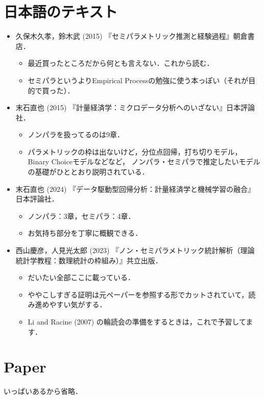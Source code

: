 \documentclass{jsarticle}
\begin{document}
\section{日本語のテキスト}

\begin{itemize}
  \item 久保木久孝，鈴木武 (2015) 『セミパラメトリック推測と経験過程』朝倉書店．
        \begin{itemize}
          \item 最近買ったところだから何とも言えない．これから読む．
          \item セミパラというよりEmpirical Processの勉強に使う本っぽい（それが目的で買った）．
        \end{itemize}  

  \item 末石直也 (2015) 『計量経済学：ミクロデータ分析へのいざない』日本評論社．
        \begin{itemize}
          \item ノンパラを扱ってるのは9章．
          \item パラメトリックの枠は出ないけど，分位点回帰，打ち切りモデル，Binary Choiceモデルなどなど，
                ノンパラ・セミパラで推定したいモデルの基礎がひととおり説明されている．
        \end{itemize}
  
  \item 末石直也 (2024) 『データ駆動型回帰分析：計量経済学と機械学習の融合』日本評論社．
        \begin{itemize}
          \item ノンパラ：3章，セミパラ：4章．
          \item お気持ち部分を丁寧に概観できる．
        \end{itemize}

  \item 西山慶彦，人見光太郎 (2023) 『ノン・セミパラメトリック統計解析（理論統計学教程：数理統計の枠組み）』共立出版．
        \begin{itemize}
          \item だいたい全部ここに載っている．
          \item ややこしすぎる証明は元ペーパーを参照する形でカットされていて，読み進めやすい気がする．
          \item Li and Racine (2007) の輪読会の準備をするときは，これで予習してます．
        \end{itemize}
\end{itemize}

\section{Paper}
いっぱいあるから省略．
\end{document}
